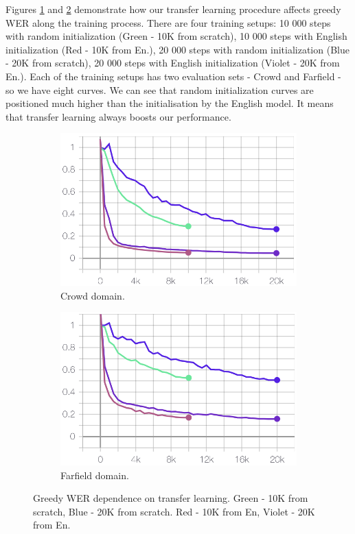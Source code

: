 \documentclass[a4paper]{article}
\begin{document}
Figures \ref{fig:crowd_domain} and \ref{fig:portal_domain} demonstrate how our transfer learning procedure affects greedy WER along the training process. There are four training setups: 10 000 steps with random initialization (Green - 10K from scratch), 10 000 steps with English initialization (Red - 10K from En.), 20 000 steps with random initialization (Blue - 20K from scratch), 20 000 steps with English initialization (Violet - 20K from En.). Each of the training setups has two evaluation sets - Crowd and Farfield - so we have eight curves. We can see that random initialization curves are positioned much higher than the initialisation by the English model. It means that transfer learning always boosts our performance.

\begin{figure}[ht]
\begin{subfigure}{.99\linewidth}
  \centering
  \includegraphics[width=1.\linewidth]{LaTeX/img/crowd10k20k.png}  
  \caption{Crowd domain.}
  \label{fig:crowd_domain}
\end{subfigure}
\begin{subfigure}{.99\linewidth}
  \centering
  \includegraphics[width=1.\linewidth]{LaTeX/img/portal10k20k.png}  
  \caption{Farfield domain.}
  \label{fig:portal_domain}
\end{subfigure}
\caption{Greedy WER dependence on transfer learning. Green - 10K from scratch, Blue - 20K from scratch. Red - 10K from En, Violet - 20K from En.}
\label{fig:portal_crowd_domain}
\end{figure}
\end{document}
